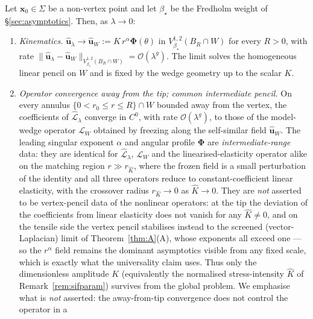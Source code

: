 \begin{proposition}
    \label{prop:blowup}
    Let $\bm{x}_0\in\Sigma$ be a non-vertex point and let $\beta_\star$ be the Fredholm weight of \S\ref{sec:asymptotics}.
    Then, as $\lambda\to0$:
    \begin{enumerate}
        \item[\textup{(i)}] \emph{Kinematics.} $\hat{\bm{u}}_\lambda\to\hat{\bm{u}}_W:=K\,r^{\alpha}\bm{\Phi}(\theta)$ in
              $V^{1,2}_{\beta_\star}(B_R\cap W)$ for every $R>0$, with rate
              $\|\hat{\bm{u}}_\lambda-\hat{\bm{u}}_W\|_{V^{1,2}_{\beta_\star}(B_R\cap W)}=\mathcal{O}(\lambda^{g})$. The
              limit solves the homogeneous linear pencil on $W$ and is fixed by the wedge geometry up to the scalar $K$.
        \item[\textup{(ii)}] \emph{Operator convergence away from the tip; common intermediate pencil.} On every annulus
              $\{0<r_0\le r\le R\}\cap W$ bounded away from the vertex, the coefficients of $\widehat{\mathcal{L}}_\lambda$
              converge in $C^0$, with rate $\mathcal{O}(\lambda^{g})$, to those of the model-wedge operator
              $\mathcal{L}_W$ obtained by freezing along the self-similar field $\hat{\bm{u}}_W$. The leading singular
              exponent $\alpha$ and angular profile $\bm{\Phi}$ are \emph{intermediate-range} data: they are identical
              for $\widehat{\mathcal{L}}_\lambda$, $\mathcal{L}_W$ and the linearised-elasticity operator alike on the
              matching region $r\gg r_{\hat K}$, where the frozen field is a small perturbation of the identity and all
              three operators reduce to constant-coefficient linear elasticity, with the crossover radius
              $r_{\hat K}\to0$ as $\hat K\to0$. They are \emph{not} asserted to be vertex-pencil data of the nonlinear
              operators: at the tip the deviation of the coefficients from linear elasticity does not vanish for any
              $\hat K\neq0$, and on the tensile side the vertex pencil stabilises instead to the screened
              (vector-Laplacian) limit of Theorem~\ref{thm:A}(A), whose exponents all exceed one --- so the $r^\alpha$
              field remains the dominant asymptotics visible from any fixed scale, which is exactly what the
              universality claim uses. Thus only the dimensionless amplitude $K$ (equivalently the
              normalised stress-intensity $\hat K$ of Remark~\ref{rem:sifparam}) survives from the global problem. We
              emphasise what is \emph{not} asserted: the away-from-tip convergence does not control the operator in a

\end{enumerate}
\end{proposition}

